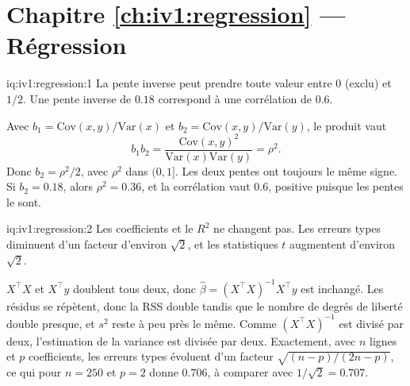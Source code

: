 \section*{Chapitre \ref{ch:iv1:regression} --- Régression}

\begin{solution}{iq:iv1:regression:1}
La pente inverse peut prendre toute valeur entre 0 (exclu) et $1/2$. Une pente inverse de $0.18$ correspond à une corrélation de $0.6$.

Avec $b_1 = \mathrm{Cov}(x,y)/\mathrm{Var}(x)$ et $b_2 = \mathrm{Cov}(x,y)/\mathrm{Var}(y)$, le produit vaut
\[
b_1 b_2 = \frac{\mathrm{Cov}(x,y)^2}{\mathrm{Var}(x)\mathrm{Var}(y)} = \rho^2 .
\]
Donc $b_2 = \rho^2/2$, avec $\rho^2$ dans $(0, 1]$. Les deux pentes ont toujours le même signe. Si $b_2 = 0.18$, alors $\rho^2 = 0.36$, et la corrélation vaut $0.6$, positive puisque les pentes le sont.

\end{solution}

\begin{solution}{iq:iv1:regression:2}
Les coefficients et le $R^2$ ne changent pas. Les erreurs types diminuent d'un facteur d'environ $\sqrt2$, et les statistiques $t$ augmentent d'environ $\sqrt2$.

$X^\top X$ et $X^\top y$ doublent tous deux, donc $\hat\beta = (X^\top X)^{-1}X^\top y$ est inchangé. Les résidus se répètent, donc la RSS double tandis que le nombre de degrés de liberté double presque, et $s^2$ reste à peu près le même. Comme $(X^\top X)^{-1}$ est divisé par deux, l'estimation de la variance est divisée par deux. Exactement, avec $n$ lignes et $p$ coefficients, les erreurs types évoluent d'un facteur $\sqrt{(n-p)/(2n-p)}$, ce qui pour $n = 250$ et $p = 2$ donne $0.706$, à comparer avec $1/\sqrt2 = 0.707$.

\end{solution}

